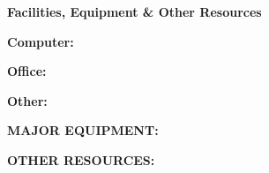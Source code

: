 
\setcounter{page}{1}
\renewcommand{\thepage}{Facilities, Equipment, and Other Resources - Page \arabic{page} of 1}

\begin{center}
\textbf{\large Facilities, Equipment \& Other Resources}
\end{center}


% 
% 

\textbf{Computer:}


\textbf{Office:}

\textbf{Other:}

\textbf{MAJOR EQUIPMENT:}


\textbf{OTHER RESOURCES:}


